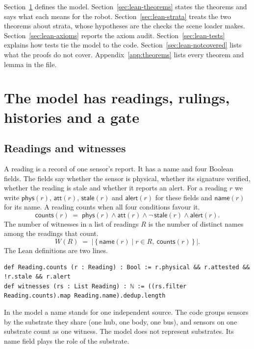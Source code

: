 Section~\ref{sec:lean-model} defines the model.
Section~\ref{sec:lean-theorems} states the theorems and says what each means for the robot.
Section~\ref{sec:lean-strata} treats the two theorems about strata, whose hypotheses are the
checks the scene loader makes.
Section~\ref{sec:lean-axioms} reports the axiom audit.
Section~\ref{sec:lean-tests} explains how tests tie the model to the code.
Section~\ref{sec:lean-notcovered} lists what the proofs do not cover.
Appendix~\ref{app:theorems} lists every theorem and lemma in the file.

\section{The model has readings, rulings, histories and a gate}\label{sec:lean-model}

\subsection{Readings and witnesses}

A reading is a record of one sensor's report.
It has a name and four Boolean fields.
The fields say whether the sensor is physical, whether its signature verified, whether the
reading is stale and whether it reports an alert.
For a reading $r$ we write $\mathsf{phys}(r)$, $\mathsf{att}(r)$, $\mathsf{stale}(r)$ and
$\mathsf{alert}(r)$ for these fields and $\mathsf{name}(r)$ for its name.
A reading counts when all four conditions favour it.
\begin{equation}
  \mathsf{counts}(r) \;=\; \mathsf{phys}(r) \wedge \mathsf{att}(r) \wedge \neg\,\mathsf{stale}(r)
  \wedge \mathsf{alert}(r).
\end{equation}
The number of witnesses in a list of readings $R$ is the number of distinct names among the
readings that count.
\begin{equation}
  W(R) \;=\; \bigl|\,\{\, \mathsf{name}(r) \mid r \in R,\ \mathsf{counts}(r) \,\}\,\bigr|.
\end{equation}
The Lean definitions are two lines.
\begin{lstlisting}[style=lean]
def Reading.counts (r : Reading) : Bool := r.physical && r.attested && !r.stale && r.alert
def witnesses (rs : List Reading) : ℕ := ((rs.filter Reading.counts).map Reading.name).dedup.length
\end{lstlisting}
In the model a name stands for one independent source.
The code groups sensors by the substrate they share (one hub, one body, one bus), and sensors on
one substrate count as one witness.
The model does not represent substrates.
Its name field plays the role of the substrate.

